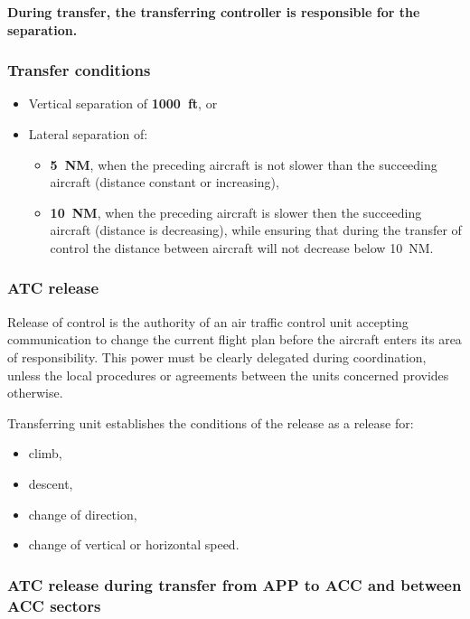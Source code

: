 \textbf{During transfer, the transferring controller is responsible for the separation.}

\subsubsection{Transfer conditions}

\begin{itemize}
\item Vertical separation of \textbf{1000~ft}, or
\item Lateral separation of:
  \begin{itemize}
  \item \textbf{5~NM}, when the preceding aircraft is not slower than the
    succeeding aircraft (distance constant or increasing),
  \item \textbf{10~NM}, when the preceding aircraft is slower then the
    succeeding aircraft (distance is decreasing), while ensuring that during the
    transfer of control the distance between aircraft will not decrease below 10~NM.
  \end{itemize}
\end{itemize}

\subsubsection{ATC release}

Release of control is the authority of an air traffic control unit accepting
communication to change the current flight plan before the aircraft enters its
area of responsibility. This power must be clearly delegated during
coordination, unless the local procedures or agreements between the units
concerned provides otherwise.

Transferring unit establishes the conditions of the release as a release for:
\begin{itemize}
\item climb,
\item descent,
\item change of direction,
\item change of vertical or horizontal speed.
\end{itemize}

\subsubsection{ATC release during transfer from APP to ACC and between ACC
  sectors}

